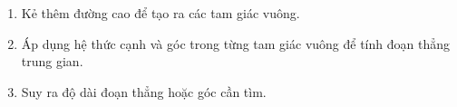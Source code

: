 \begin{enumerate}
\item Kẻ thêm đường cao để tạo ra các tam giác vuông.
\item Áp dụng hệ thức cạnh và góc trong từng tam giác vuông để tính đoạn thẳng trung gian.
\item Suy ra độ dài đoạn thẳng hoặc góc cần tìm.
\end{enumerate}
